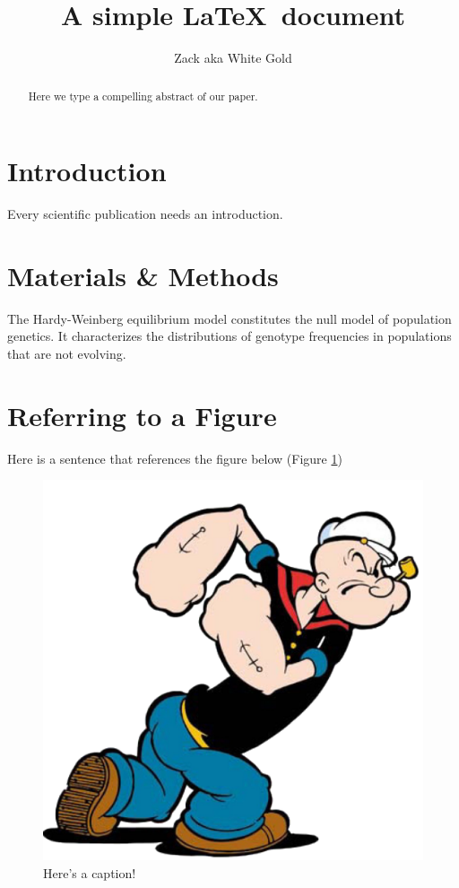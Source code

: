 \documentclass[12pt]{article}
\title{A simple \LaTeX\ document}
\author{Zack aka White Gold}
\date{}
\begin{document}
\maketitle
\begin{abstract}
Here we type a compelling abstract of our paper.
\end{abstract}
\section{Introduction}
Every scientific publication needs an introduction.
\section{Materials \& Methods}
The Hardy-Weinberg equilibrium model constitutes the null model of population genetics. It characterizes the distributions of genotype  frequencies in populations that are not evolving.
\section{Referring to a Figure}
Here is a sentence that references the figure below (Figure \ref{fig:pop})

\begin{figure}
  \label{fig:pop}
\begin{center}
 \includegraphics[width=0.5\linewidth]{figures/popeye.png}
\end{center}
\caption{Here's a caption!}

 \end{figure}
\end{document}
